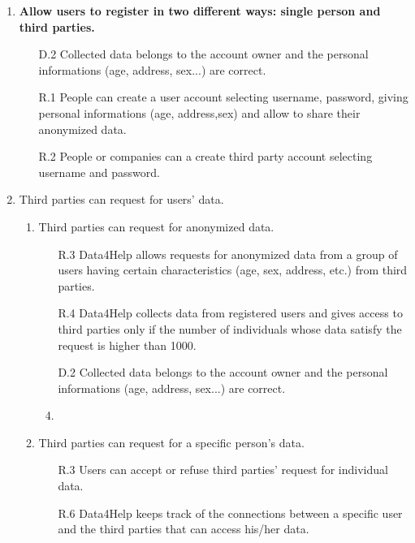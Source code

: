 \documentclass[a4paper]{article}
\begin{document}
\begin{enumerate}[label*=\bf{G.\arabic*}]
	
	
	\item \textbf{Allow users to register in two different ways: single person and third parties.}
	
	\begin{enumerate}
	    \item [D.2] Collected data belongs to the account owner and the personal informations (age, address, sex...) are correct.
	    \item [R.1] People can create a user account selecting username, password, giving personal informations (age, address,sex) and allow to share their anonymized data.
	    \item [R.2] People or companies can a create third party account selecting username and password.
	\end{enumerate}
	
	\item Third parties can request for users' data.
	    
    \begin{enumerate}[label*=.\arabic*]
        \item Third parties can request for anonymized data.
	        
        \begin{enumerate}
	        \item [R.3] Data4Help allows requests for anonymized data from a group of users having certain characteristics (age, sex, address, etc.) from third parties.
            \item [R.4] Data4Help collects data from registered users and gives access to third parties only if the number of individuals whose data satisfy the request is higher than 1000.
            \item [D.2] Collected data belongs to the account owner and the personal informations (age, address, sex...) are correct.
            \item     
        \end{enumerate}

        \item Third parties can request for a specific person's data.
	        
        \begin{enumerate}
            \item [R.3] Users can accept or refuse third parties' request for individual data.
            \item [R.6] Data4Help keeps track of the connections between a specific user and the third parties that can access his/her data.
        \end{enumerate}
	        

\end{enumerate}
\end{enumerate}
\end{document}
